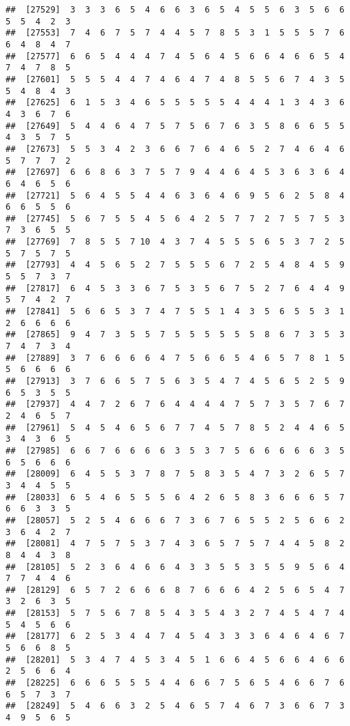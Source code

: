 \documentclass[
]{book}
\begin{document}
\begin{verbatim}
##  [27529]  3  3  3  6  5  4  6  6  3  6  5  4  5  5  6  3  5  6  6  5  5  4  2  3
##  [27553]  7  4  6  7  5  7  4  4  5  7  8  5  3  1  5  5  5  7  6  6  4  8  4  7
##  [27577]  6  6  5  4  4  4  7  4  5  6  4  5  6  6  4  6  6  5  4  7  4  7  8  5
##  [27601]  5  5  5  4  4  7  4  6  4  7  4  8  5  5  6  7  4  3  5  5  4  8  4  3
##  [27625]  6  1  5  3  4  6  5  5  5  5  5  4  4  4  1  3  4  3  6  4  3  6  7  6
##  [27649]  5  4  4  6  4  7  5  7  5  6  7  6  3  5  8  6  6  5  5  4  3  5  7  5
##  [27673]  5  5  3  4  2  3  6  6  7  6  4  6  5  2  7  4  6  4  6  5  7  7  7  2
##  [27697]  6  6  8  6  3  7  5  7  9  4  4  6  4  5  3  6  3  6  4  6  4  6  5  6
##  [27721]  5  6  4  5  5  4  4  6  3  6  4  6  9  5  6  2  5  8  4  6  6  5  5  6
##  [27745]  5  6  7  5  5  4  5  6  4  2  5  7  7  2  7  5  7  5  3  7  3  6  5  5
##  [27769]  7  8  5  5  7 10  4  3  7  4  5  5  5  6  5  3  7  2  5  5  7  5  7  5
##  [27793]  4  4  5  6  5  2  7  5  5  5  6  7  2  5  4  8  4  5  9  5  5  7  3  7
##  [27817]  6  4  5  3  3  6  7  5  3  5  6  7  5  2  7  6  4  4  9  5  7  4  2  7
##  [27841]  5  6  6  5  3  7  4  7  5  5  1  4  3  5  6  5  5  3  1  2  6  6  6  6
##  [27865]  9  4  7  3  5  5  7  5  5  5  5  5  5  8  6  7  3  5  3  7  4  7  3  4
##  [27889]  3  7  6  6  6  6  4  7  5  6  6  5  4  6  5  7  8  1  5  5  6  6  6  6
##  [27913]  3  7  6  6  5  7  5  6  3  5  4  7  4  5  6  5  2  5  9  6  5  3  5  5
##  [27937]  4  4  7  2  6  7  6  4  4  4  4  7  5  7  3  5  7  6  7  2  4  6  5  7
##  [27961]  5  4  5  4  6  5  6  7  7  4  5  7  8  5  2  4  4  6  5  3  4  3  6  5
##  [27985]  6  6  7  6  6  6  6  3  5  3  7  5  6  6  6  6  6  3  5  6  5  6  6  6
##  [28009]  6  4  5  5  3  7  8  7  5  8  3  5  4  7  3  2  6  5  7  3  4  4  5  5
##  [28033]  6  5  4  6  5  5  5  6  4  2  6  5  8  3  6  6  6  5  7  6  6  3  3  5
##  [28057]  5  2  5  4  6  6  6  7  3  6  7  6  5  5  2  5  6  6  2  3  6  4  2  7
##  [28081]  4  7  5  7  5  3  7  4  3  6  5  7  5  7  4  4  5  8  2  8  4  4  3  8
##  [28105]  5  2  3  6  4  6  6  4  3  3  5  5  3  5  5  9  5  6  4  7  7  4  4  6
##  [28129]  6  5  7  2  6  6  6  8  7  6  6  6  4  2  5  6  5  4  7  3  2  6  3  5
##  [28153]  5  7  5  6  7  8  5  4  3  5  4  3  2  7  4  5  4  7  4  5  4  5  6  6
##  [28177]  6  2  5  3  4  4  7  4  5  4  3  3  3  6  4  6  4  6  7  5  6  6  8  5
##  [28201]  5  3  4  7  4  5  3  4  5  1  6  6  4  5  6  6  4  6  6  2  5  6  6  4
##  [28225]  6  6  6  5  5  5  4  4  6  6  7  5  6  5  4  6  6  7  6  6  5  7  3  7
##  [28249]  5  4  6  6  3  2  5  4  6  5  7  4  6  7  3  6  6  7  3  4  9  5  6  5

\end{verbatim}
\end{document}
